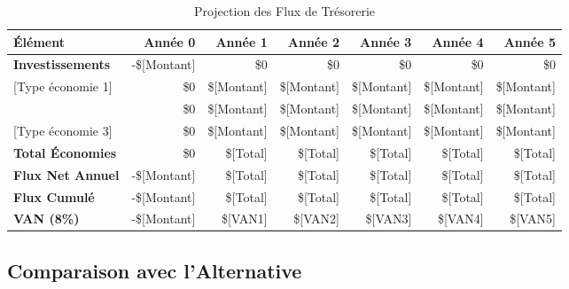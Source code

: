 \begin{table}[H]
\centering
\caption{Projection des Flux de Trésorerie}
\label{tab:cashflow}
\begin{tabular}{|l|r|r|r|r|r|r|}
\hline
\rowcolor{DollaramaGreen!30}
\textbf{\color{white}Élément} & 
\textbf{\color{white}Année 0} & 
\textbf{\color{white}Année 1} & 
\textbf{\color{white}Année 2} & 
\textbf{\color{white}Année 3} & 
\textbf{\color{white}Année 4} & 
\textbf{\color{white}Année 5} \\
\hline
\textbf{Investissements} & -\$[Montant] & \$0 & \$0 & \$0 & \$0 & \$0 \\
\hline
\rowcolor{gray!10}
[Type économie 1] & \$0 & \$[Montant] & \$[Montant] & \$[Montant] & \$[Montant] & \$[Montant] \\
\hline
[Type économie 2] & \$0 & \$[Montant] & \$[Montant] & \$[Montant] & \$[Montant] & \$[Montant] \\
\hline
\rowcolor{gray!10}
[Type économie 3] & \$0 & \$[Montant] & \$[Montant] & \$[Montant] & \$[Montant] & \$[Montant] \\
\hline
\textbf{Total Économies} & \$0 & \$[Total] & \$[Total] & \$[Total] & \$[Total] & \$[Total] \\
\hline
\rowcolor{DollaramaGreen!20}
\textbf{Flux Net Annuel} & -\$[Montant] & \$[Total] & \$[Total] & \$[Total] & \$[Total] & \$[Total] \\
\hline
\textbf{Flux Cumulé} & -\$[Montant] & \$[Total] & \$[Total] & \$[Total] & \$[Total] & \$[Total] \\
\hline
\rowcolor{DollaramaYellow!20}
\textbf{VAN (8\%)} & -\$[Montant] & \$[VAN1] & \$[VAN2] & \$[VAN3] & \$[VAN4] & \$[VAN5] \\
\hline
\end{tabular}
\end{table}

\subsection{Comparaison avec l'Alternative}

